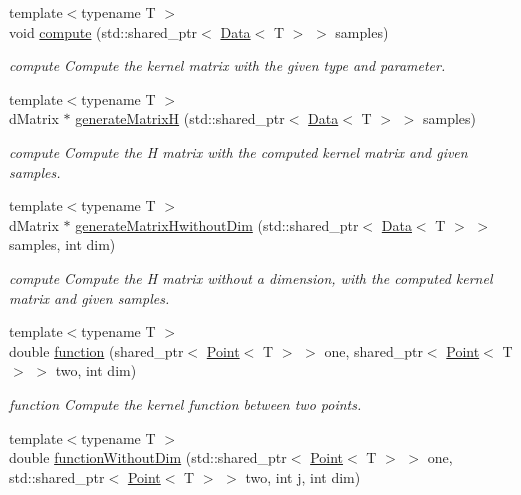 \begin{DoxyCompactItemize}
{\footnotesize template$<$typename T $>$ }\\void \hyperlink{class_kernel_a214aeb35c89e67cf7677c61f7b0a843f}{compute} (std\+::shared\+\_\+ptr$<$ \hyperlink{class_data}{Data}$<$ T $>$ $>$ samples)
\begin{DoxyCompactList}\small\item\em compute Compute the kernel matrix with the given type and parameter. \end{DoxyCompactList}\item 
{\footnotesize template$<$typename T $>$ }\\d\+Matrix $\ast$ \hyperlink{class_kernel_a126dcd1fa57f69af243ca678170288b6}{generate\+MatrixH} (std\+::shared\+\_\+ptr$<$ \hyperlink{class_data}{Data}$<$ T $>$ $>$ samples)
\begin{DoxyCompactList}\small\item\em compute Compute the H matrix with the computed kernel matrix and given samples. \end{DoxyCompactList}\item 
{\footnotesize template$<$typename T $>$ }\\d\+Matrix $\ast$ \hyperlink{class_kernel_a32f8639c734692862062817efaeead64}{generate\+Matrix\+Hwithout\+Dim} (std\+::shared\+\_\+ptr$<$ \hyperlink{class_data}{Data}$<$ T $>$ $>$ samples, int dim)
\begin{DoxyCompactList}\small\item\em compute Compute the H matrix without a dimension, with the computed kernel matrix and given samples. \end{DoxyCompactList}\item 
{\footnotesize template$<$typename T $>$ }\\double \hyperlink{class_kernel_a48ef2d6a0786b1a150f75af3f595c536}{function} (shared\+\_\+ptr$<$ \hyperlink{class_point}{Point}$<$ T $>$ $>$ one, shared\+\_\+ptr$<$ \hyperlink{class_point}{Point}$<$ T $>$ $>$ two, int dim)
\begin{DoxyCompactList}\small\item\em function Compute the kernel function between two points. \end{DoxyCompactList}\item 
{\footnotesize template$<$typename T $>$ }\\double \hyperlink{class_kernel_aae7563927691a73b6f20b0194087c035}{function\+Without\+Dim} (std\+::shared\+\_\+ptr$<$ \hyperlink{class_point}{Point}$<$ T $>$ $>$ one, std\+::shared\+\_\+ptr$<$ \hyperlink{class_point}{Point}$<$ T $>$ $>$ two, int j, int dim)

\end{DoxyCompactItemize}

